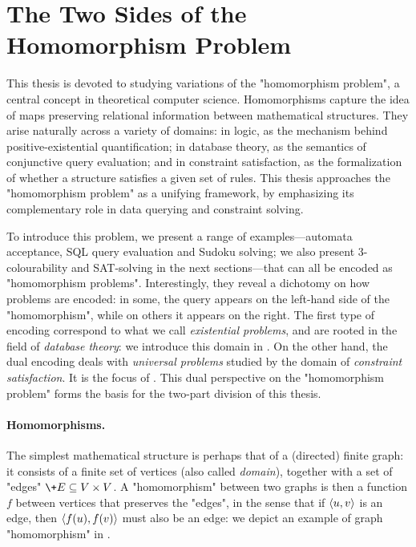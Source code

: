 \section{The Two Sides of the Homomorphism Problem}

This thesis is devoted to studying variations of the "homomorphism problem",
a central concept in theoretical computer science.
Homomorphisms capture the idea of maps preserving relational information between mathematical structures.
They arise naturally across a variety of domains: in logic, as the mechanism behind positive-existential quantification; in database theory, as the semantics of conjunctive query evaluation; and in constraint satisfaction, as the formalization of whether a structure
satisfies a given set of rules. This thesis approaches the "homomorphism problem" as a unifying framework, by emphasizing its complementary role in data querying and constraint solving.

To introduce this problem, we present a range of examples---automata acceptance, SQL query evaluation and Sudoku solving; we also present 3-colourability and SAT-solving in the next sections---that can all be encoded as "homomorphism problems".
Interestingly, they reveal a dichotomy on how problems are encoded:
in some, the query appears on the left-hand side of the "homomorphism", 
while on others it appears on the right.
The first type of encoding correspond to what we call \emph{existential problems},
and are rooted in the field of \emph{database theory}:
we introduce this domain in .
On the other hand, the dual encoding deals with \emph{universal problems}
studied by the domain of \emph{constraint satisfaction}.
It is the focus of .
This dual perspective on the "homomorphism problem"
forms the basis for the two-part division of this thesis.

\paragraph*{Homomorphisms.}
The simplest mathematical structure is perhaps that of a (directed) finite graph:
it consists of a finite set of vertices (also called \emph{domain}),
together with a set of "edges" $\+E \subseteq V \times V$.
A "homomorphism" between two graphs is then a
function $f$ between vertices that preserves
the "edges", in the sense that if $\langle u,v\rangle$ is an edge, then
$\langle f(u),f(v)\rangle$ must also be an edge: we depict
an example of graph "homomorphism" in .

